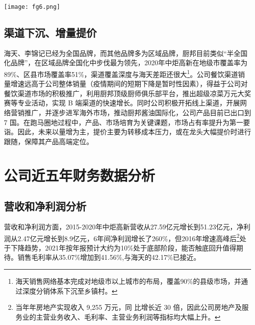 \documentclass[UTF8,a4paper,zihao=-4,fontset = windows]{ctexart} %
\begin{document}
\texttt{[image: fg6.png]} 

\subsection{渠道下沉、增量提价}
海天、李锦记已经为全国品牌，而其他品牌多为区域品牌，厨邦目前类似“半全国化品牌”，在区域品牌全国化中步伐最为领先，2020年中炬高新在地级市覆盖率为89\%、区县市场覆盖率51\%，渠道覆盖深度与海天差距还很大\footnote{海天销售网络基本完成对地级市以上城市的布局，覆盖90\%的县级市场，并通过深度分销体系下沉至乡镇村。}。公司餐饮渠道销量增速远高于公司整体销量（疫情期间的短期下降是暂时性因素），得益于公司对餐饮渠道市场的积极推广，利用厨邦顶级厨师俱乐部平台，推出超级凉菜万元大奖赛等专业活动，实现 B 端渠道的快速增长。同时公司积极开拓线上渠道，开展网络营销推广，并逐步进军海外市场，推动厨邦酱油国际化，公司产品目前已出口到 7 国。在跑马圈地过程中，产品、市场培育为关键课题，市场占有率提升为第一要诣。因此，未来以量增为主，提价主要为转移成本压力，或在龙头大幅提价时进行跟随，保障其产品高端定位。

\section{公司近五年财务数据分析}
\subsection{营收和净利润分析}
营收和净利润方面，2015-2020年中炬高新营收从27.59亿元增长到51.23亿元，净利润从2.47亿元增长到8.9亿元，6年间净利润增长了260\%，但2016年增速高峰后\footnote{当年年房地产实现收入 9,255 万元，同
比增长近 30 倍，因此公司房地产及服务业的主营业务收入、毛利率、主营业务利润等指标均大幅上升。}处于下降趋势，2021年按年报预计大约为10\%处于底部阶段，能否触底回升值得期待。销售毛利率从35.07\%增加到41.56\%,与海天的42.17\%已接近。
\end{document}
